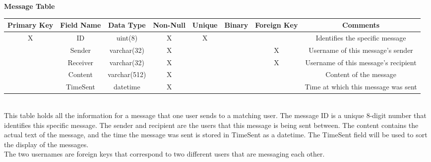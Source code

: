 \documentclass{article}
\begin{document}
\begin{enumerate}
        \textbf{Message Table}\\
        \begin{adjustbox}{width=1.2\textwidth}
            \begin{tabular}{|c|c|c|c|c|c|c|c|}
                \hline
                Primary Key & Field Name & Data Type & Non-Null & Unique & Binary & Foreign Key & Comments \\ \hline
                X & ID & uint(8) & X & X &  &  & Identifies the specific message\\ \hline
                 & Sender & varchar(32) & X &  &  & X & Username of this message's sender\\ \hline
                 & Receiver & varchar(32) & X &  &  & X & Username of this message's recipient\\ \hline
                 & Content & varchar(512) & X &  &  &  & Content of the message\\ \hline
                 & TimeSent & datetime & X &  &  &  & Time at which this message was sent\\ \hline
            \end{tabular}
        \end{adjustbox}\\
        This table holds all the information for a message that one user sends to a matching user. The message ID is a unique 8-digit number that identifies this specific message. The sender and recipient are the users that this message is being sent between. The content contains the actual text of the message, and the time the message was sent is stored in TimeSent as a datetime. The TimeSent field will be used to sort the display of the messages.\\
        The two usernames are foreign keys that correspond to two different users that are messaging each other.\\
        

\end{enumerate}
\end{document}
